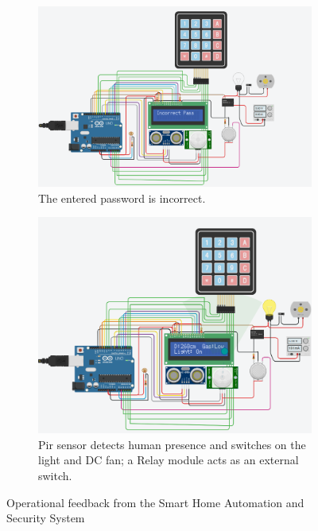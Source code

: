 \documentclass[a4paper,12pt]{article}
\begin{document}
\begin{figure}[H]
  \vspace{1em} 
  \begin{subfigure}{0.45\textwidth}
    \centering
    \includegraphics[width=\linewidth]{incorrect.png}
    \caption{The entered password is incorrect.}
  \end{subfigure}
  \hfill
  \begin{subfigure}{0.45\textwidth}
      \centering
      \includegraphics[width=\linewidth]{pirsensor1.png}
      \caption{Pir sensor detects human presence and switches on the light and DC fan; a Relay module acts as an external switch.}
  \end{subfigure}
  \caption{Operational feedback from the Smart Home Automation and Security System}
  \label{fig:operational_feedback}
\end{figure}
\end{document}
